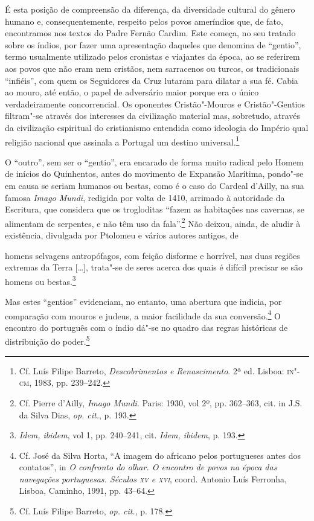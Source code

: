 É esta posição de compreensão da diferença, da diversidade cultural
do gênero humano e, consequentemente, respeito pelos povos ameríndios
que, de fato, encontramos nos textos do Padre Fernão Cardim. Este
começa, no seu tratado sobre os índios, por fazer uma
apresentação daqueles que denomina de ``gentio'', termo
usualmente utilizado pelos cronistas e viajantes da época, ao se
referirem aos povos que não eram nem cristãos, nem sarracenos ou
turcos, os tradicionais ``infiéis'', com quem os Seguidores da Cruz
lutaram para dilatar a sua fé. Cabia ao mouro, até então, o papel de
adversário maior porque era o único verdadeiramente concorrencial. Os
oponentes Cristão"-Mouros e Cristão"-Gentios filtram"-se
através dos interesses da civilização material mas, sobretudo, através
da civilização espiritual do cristianismo entendida como ideologia do
Império qual religião nacional que assinala a Portugal um
destino universal.\footnote{ Cf. Luís Filipe Barreto,
\textit{Descobrimentos e Renascimento}. 2ª ed. Lisboa: \textsc{in"-cm}, 1983, pp. 239--242.} 

 O ``outro'', sem ser o ``gentio'', era encarado de forma muito
radical pelo Homem de inícios do Quinhentos, antes do movimento
de Expansão Marítima, pondo"-se em causa se seriam humanos ou bestas,
como é o caso do Cardeal d'Ailly, na sua famosa \textit{Imago Mundi}, 
redigida por volta de 1410, arrimado à autoridade da Escritura, que 
considera que os trogloditas ``fazem as habitações nas cavernas, se
alimentam de serpentes, e não têm uso da fala''.\footnote{ Cf. Pierre 
d'Ailly, \textit{Imago Mundi}. Paris: 1930, vol 2º, pp. 362--363, cit. in J.S. da Silva Dias,
\textit{op. cit.}, p. 193.} Não deixou, ainda, de aludir à
existência, divulgada por Ptolomeu e vários autores antigos, de

\begin{hedraquote}
[\ldots{}] homens selvagens antropófagos, com feição disforme e horrível,
nas duas regiões extremas da Terra [\ldots{}], trata"-se de seres acerca dos
quais é difícil precisar se são homens ou bestas.\footnote{ \textit{Idem, ibidem}, 
vol 1, pp. 240--241, cit. \textit{Idem, ibidem}, p. 193.} 
\end{hedraquote}

Mas estes ``gentios'' evidenciam, no entanto, uma
abertura que indicia, por comparação com mouros e judeus, a maior
facilidade da sua conversão.\footnote{ Cf. José da Silva Horta, 
``A imagem do africano pelos portugueses antes dos contatos'', in
\textit{O confronto do olhar. O encontro de povos na época das
navegações portuguesas. Séculos \textsc{xv} e \textsc{xvi}}, coord. Antonio Luís Ferronha,
Lisboa, Caminho, 1991, pp. 43--64.} O encontro do português com o índio
dá"-se no quadro das regras históricas de distribuição do 
poder.\footnote{ Cf. Luís Filipe Barreto, \textit{op. cit.}, p. 178.}

